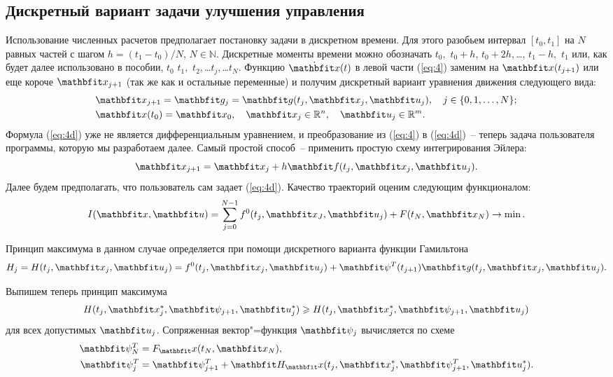 \documentclass[a4paper,14pt, openany, twoside, final]{extbook} %
\begin{document}
\subsection{Дискретный вариант задачи улучшения управления}
\label{sec:discrete}

Использование численных расчетов предполагает постановку задачи в дискретном времени.  Для этого разобьем интервал $[t_0,t_1]$ на $N$ равных частей с шагом $h=(t_1-t_0)/N$, $N\in\mathbb{N}$.  Дискретные моменты времени можно обозначать $t_0,$ $t_0+h$, $t_0+2h,$\ldots, $t_1-h,$ $t_1$ или, как будет далее использовано в пособии, $t_0$ $t_1,$ $t_2,$\ldots $t_j,$\ldots $t_N$.  Функцию $\dot{\vecx}(t)$ в левой части (\ref{eq:4}) заменим на $\vecx(t_{j+1})$ или еще короче $\vecx_{j+1}$ (так же как и остальные переменные) и получим дискретный вариант уравнения движения следующего вида:
\begin{align}
 \label{eq:4d}
 &\vecx_{j+1}=\vecg_j=\vecg(t_j,\vecx_j,\vecu_j),\quad j\in\{0,1,\ldots,N\};\\
  \label{eq:4dcond}
  &\vecx(t_0)=\vecx_0, \quad \vecx_j\in\mathbb{R}^n,  \quad \vecu_j\in\mathbb{R}^m.
\end{align}
Формула (\ref{eq:4d}) уже не является дифференциальным уравнением, и преобразование из (\ref{eq:4}) в (\ref{eq:4d})~-- теперь задача пользователя программы, которую мы разработаем далее.  Самый простой способ~-- применить простую схему интегрирования Эйлера:
\begin{equation}
  \label{eq:4d1} \nonumber
  \vecx_{j+1}=\vecx_j+h\vecf(t_j,\vecx_j,\vecu_j).
\end{equation}
Далее будем предполагать, что пользователь сам задает (\ref{eq:4d}).  Качество траекторий оценим следующим функционалом:
\begin{equation}
  I(\vecx,\vecu)=\sum_{j=0}^{N-1}f^0(t_j,\vecx_J,\vecu_j)+F(t_N,\vecx_N) \to \min.
    \label{eq103}
\end{equation}

Принцип максимума в данном случае определяется при помощи дискретного варианта функции Гамильтона
\begin{equation}
  H_j=H(t_j,\vecx_j,\vecu_j)=f^0(t_j,\vecx_j,\vecu_j)+
   \vecpsi^T(t_{j+1})\vecg(t_j,\vecx_j,\vecu_j).   \label{eq:descH}
\end{equation}

Выпишем теперь принцип максимума
\begin{align}
  H(t_j,\vecx^*_j,\vecpsi_{j+1},\vecu^*_j)\geqslant H(t_j,\vecx^*_j,\vecpsi_{j+1},\vecu_j) \label{eq:descMax}
\end{align}
для всех допустимых $\vecu_j$.  Сопряженная вектор"=функция $\vecpsi_j$ вычисляется по схеме
\begin{align}
  \label{eq:startPsi}
  \vecpsi^T_N&=F_\vecx(t_N,\vecx_N), \nonumber\\ \vecpsi^T_j&=\vecpsi^T_{j+1}+\vecH_\vecx(t_j,\vecx^*_j,\vecpsi^T_{j+1},\vecu^*_j).
\end{align}
\end{document}
